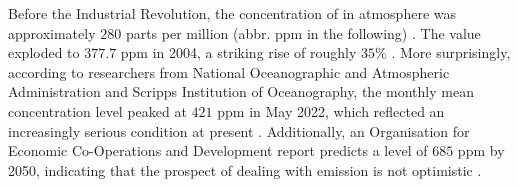 \documentclass[12pt,a4paper]{article}
\begin{document}
    Before the Industrial Revolution, the concentration of  in atmosphere was approximately $280$ parts per million (abbr. ppm in the following) \autocite{neftel_evidence_1985}. The value exploded to $377.7$ ppm in 2004, a striking rise of roughly $35\%$ \autocite{pieter_t_trends_2022}. More surprisingly, according to researchers from National Oceanographic and Atmospheric Administration and Scripps Institution of Oceanography, the monthly mean  concentration level peaked at $421$ ppm in May 2022, which reflected an increasingly serious condition at present \autocite{national_oceanographic_and_atmospheric_administration_carbon_2022}. Additionally, an Organisation for Economic Co-Operations and Development report predicts a  level of $685$ ppm by 2050, indicating that the prospect of dealing with  emission is not optimistic \autocite{organisation_for_economic_co-operations_and_development_oecd_2012}.
\end{document}
